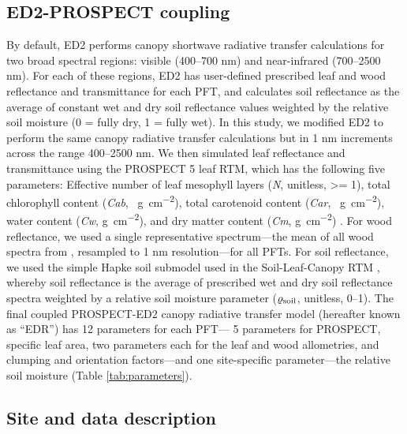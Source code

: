 \subsection{ED2-PROSPECT coupling}

By default, ED2 performs canopy shortwave radiative transfer calculations for two broad spectral regions: visible (400--700 \unit{nm}) and near-infrared (700--2500 \unit{nm}).
For each of these regions, ED2 has user-defined prescribed leaf and wood reflectance and transmittance for each PFT, and calculates soil reflectance as the average of constant wet and dry soil reflectance values weighted by the relative soil moisture (0 = fully dry, 1 = fully wet).
In this study, we modified ED2 to perform the same canopy radiative transfer calculations but in 1 \unit{nm} increments across the range 400--2500 \unit{nm}.
We then simulated leaf reflectance and transmittance using the PROSPECT 5 leaf RTM,
which has the following five parameters:
Effective number of leaf mesophyll layers (\emph{N}, unitless, >= 1),
total chlorophyll content (\emph{Cab}, \unit{\mu g ~ cm^{-2}}),
total carotenoid content (\emph{Car}, \unit{\mu g ~ cm^{-2}}),
water content (\emph{Cw}, \unit{g ~ cm^{-2}}),
and dry matter content (\emph{Cm}, \unit{g ~ cm^{-2}})
\citep{feret2008prospect4}.
For wood reflectance, we used a single representative spectrum---the mean of all wood spectra from \citet{asner1998biophysical}, resampled to 1 \unit{nm} resolution---for all PFTs.
For soil reflectance, we used the simple Hapke soil submodel used in the Soil-Leaf-Canopy RTM \citep{verhoef2007coupled}, whereby soil reflectance is the average of prescribed wet and dry soil reflectance spectra weighted by a relative soil moisture parameter ($\varrho_{\mathrm{soil}}$, unitless, 0--1).
The final coupled PROSPECT-ED2 canopy radiative transfer model (hereafter known as ``EDR'') has 12 parameters for each PFT---
5 parameters for PROSPECT, specific leaf area, two parameters each for the leaf and wood allometries, and clumping and orientation factors---and one site-specific parameter---the relative soil moisture (Table \ref{tab:parameters}).

\subsection{Site and data description}

